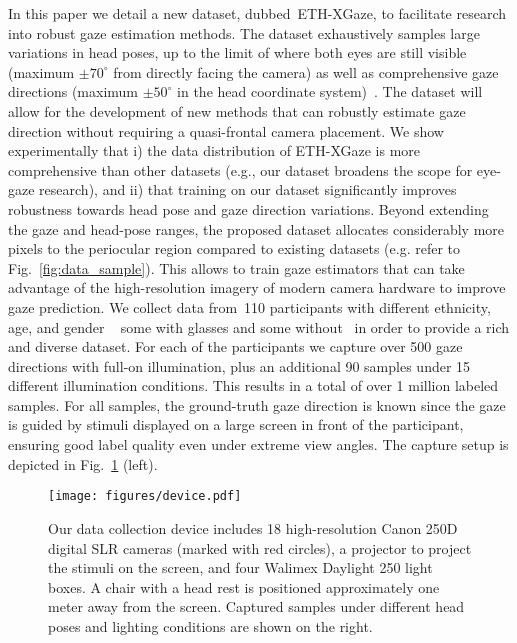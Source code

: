 \documentclass[runningheads]{llncs}
\newcommand{\datasetname}{ETH-XGaze\xspace}
\newcommand{\numparticipant}{110\xspace}
\begin{document}
In this paper we detail a new dataset, dubbed~\datasetname, to facilitate research into robust gaze estimation methods. The dataset exhaustively samples large variations in head poses, up to the limit of where both eyes are still visible (maximum $\pm70^{\circ}$ from directly facing the camera) as well as comprehensive gaze directions (maximum $\pm50^{\circ}$ in the head coordinate system)~\cite{ruch1960medical}.
The dataset will allow for the development of new methods that can robustly estimate gaze direction without requiring a quasi-frontal camera placement. We show experimentally that 
i) the data distribution of \datasetname is more comprehensive than other datasets 
(e.g., our dataset broadens the scope for eye-gaze research),
and ii) that training on our dataset significantly improves robustness towards head pose and gaze direction variations. 
Beyond extending the gaze and head-pose ranges, the proposed dataset allocates considerably more pixels to the periocular region compared to existing datasets (e.g. refer to Fig.~\ref{fig:data_sample}). This allows to train gaze estimators that can take advantage of the high-resolution imagery of modern camera hardware to improve gaze prediction. We collect data from~\numparticipant participants with different ethnicity, age, and gender \textendash~ some with glasses and some without \textendash~in order to provide a rich and diverse dataset. For each of the participants we capture over 500 gaze directions with full-on illumination, plus an additional 90 samples under 15 different illumination conditions. This results in a total of over 1 million labeled samples. For all samples, the ground-truth gaze direction is known since the gaze is guided by stimuli displayed on a large screen in front of the participant, ensuring good label quality even under extreme view angles.
The capture setup is depicted in Fig.~\ref{fig:device} (left).

\begin{figure}[t]
    \centering
    \texttt{[image: figures/device.pdf]}
    \caption{Our data collection device includes 18 high-resolution Canon 250D digital SLR cameras (marked with red circles), a projector to project the stimuli on the screen, and four Walimex Daylight 250 light boxes. A chair with a head rest is positioned approximately one meter away from the screen. Captured samples under different head poses and lighting conditions are shown on the right.}
    \label{fig:device}
\end{figure}
\end{document}
